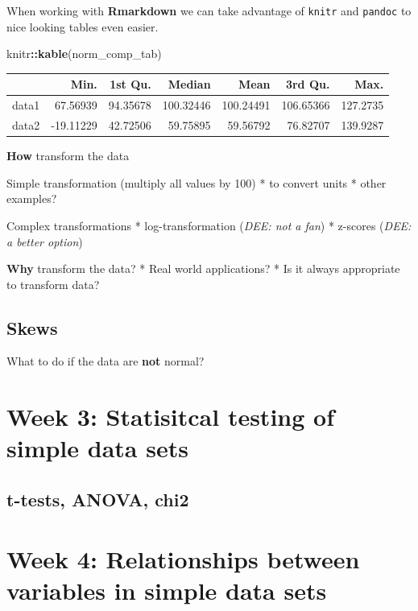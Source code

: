 \documentclass[
]{book}
\newenvironment{Shaded}{\begin{snugshade}}{\end{snugshade}}
\newcommand{\KeywordTok}[1]{\textcolor[rgb]{0.13,0.29,0.53}{\textbf{#1}}}
\newcommand{\NormalTok}[1]{#1}
\newcommand{\OperatorTok}[1]{\textcolor[rgb]{0.81,0.36,0.00}{\textbf{#1}}}
\begin{document}
When working with \textbf{Rmarkdown} we can take advantage of \texttt{knitr} and \texttt{pandoc} to nice looking tables even easier.

\begin{Shaded}
\begin{Highlighting}[]
\NormalTok{knitr}\OperatorTok{::}\KeywordTok{kable}\NormalTok{(norm_comp_tab)}
\end{Highlighting}
\end{Shaded}

\begin{tabular}{l|r|r|r|r|r|r}
\hline
  & Min. & 1st Qu. & Median & Mean & 3rd Qu. & Max.\\
\hline
data1 & 67.56939 & 94.35678 & 100.32446 & 100.24491 & 106.65366 & 127.2735\\
\hline
data2 & -19.11229 & 42.72506 & 59.75895 & 59.56792 & 76.82707 & 139.9287\\
\hline
\end{tabular}

\textbf{How} transform the data

Simple transformation (multiply all values by 100)
* to convert units
* other examples?

Complex transformations
* log-transformation (\emph{DEE: not a fan})
* z-scores (\emph{DEE: a better option})

\textbf{Why} transform the data?
* Real world applications?
* Is it always appropriate to transform data?

\hypertarget{skews}{%
\subsection{Skews}\label{skews}}

What to do if the data are \textbf{not} normal?

\hypertarget{week-3-statisitcal-testing-of-simple-data-sets-1}{%
\section{Week 3: Statisitcal testing of simple data sets}\label{week-3-statisitcal-testing-of-simple-data-sets-1}}

\hypertarget{t-tests-anova-chi2}{%
\subsection{t-tests, ANOVA, chi2}\label{t-tests-anova-chi2}}

\hypertarget{week-4-relationships-between-variables-in-simple-data-sets}{%
\section{Week 4: Relationships between variables in simple data sets}\label{week-4-relationships-between-variables-in-simple-data-sets}}
\end{document}
